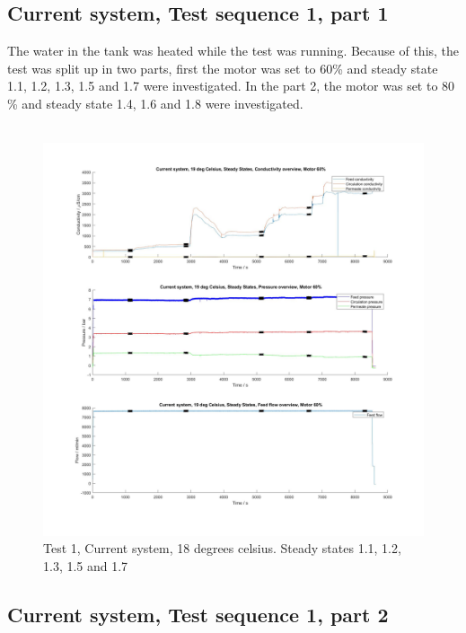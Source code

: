 \newpage
\subsection{Current system, Test sequence 1, part 1}

The water in the tank was heated while the test was running. Because of this, the test was split up in two parts, first the motor was set to 60\% and steady state 1.1, 1.2, 1.3, 1.5 and 1.7 were investigated. In the part 2, the motor was set to 80 \% and steady state 1.4, 1.6 and 1.8 were investigated. \\
\\
\begin{figure}[h]
    \centering
    \includegraphics[width=1.1\textwidth]{overview20_60}
    \caption{Test 1, Current system, 18 degrees celsius. Steady states 1.1, 1.2, 1.3, 1.5 and 1.7 }
    \label{fig:PressConn}
\end{figure}

\newpage

\subsection{Current system, Test sequence 1, part 2}
  
